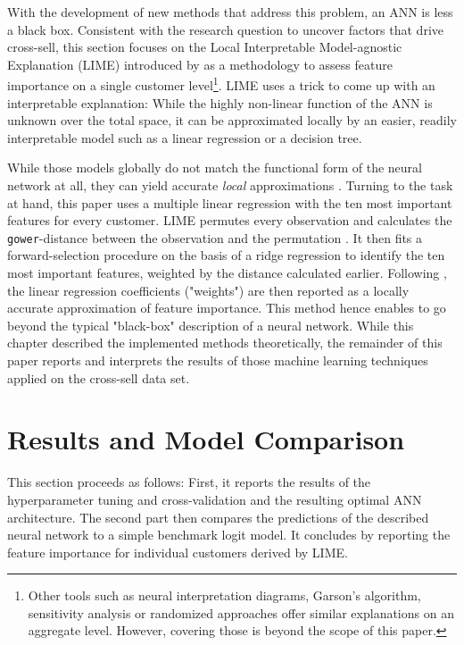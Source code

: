 \documentclass[12pt,a4paper]{article}
\let\code=\texttt
\begin{document}
With the development of new methods that address this problem, an ANN is less a black box.
Consistent with the research question to uncover factors that drive cross-sell, 
this section focuses on the Local Interpretable Model-agnostic Explanation (LIME) introduced by \cite{ribeiroWhyShouldTrust2016a} as a methodology
to assess feature importance on a single customer level\footnote{Other tools such as neural interpretation diagrams, Garson's algorithm, sensitivity analysis or randomized approaches
\citep{oldenIlluminatingBlackBox2002} offer similar explanations on an aggregate level. However, covering those is beyond the scope of this paper.}.
LIME uses a trick to come up with an interpretable explanation: While the highly non-linear function of the ANN is unknown over the total space,
it can be approximated locally by an easier, readily interpretable model such as a linear regression or a decision tree.

While those models globally do not match the functional form of the neural network at all, they can yield accurate \textit{local} approximations
\citep[see figure 3 for a visual example]{ribeiroWhyShouldTrust2016a}.
Turning to the task at hand, this paper uses a multiple linear regression with the ten most important features for every customer.
LIME permutes every observation and calculates the \code{gower}-distance between the observation and the permutation \citep{pedersenUnderstandingLime2018}.
It then fits a forward-selection procedure on the basis of a ridge regression \citep{pedersenPackageLimeLocal2018} to identify the ten most 
important features, weighted by the distance calculated earlier.
Following \cite{ribeiroWhyShouldTrust2016a}, the linear regression coefficients ("weights") are then reported as a locally accurate approximation of feature importance.
This method hence enables to go beyond the typical "black-box" description of a neural network.
While this chapter described the implemented methods theoretically, the remainder of this paper reports and interprets the results of those 
machine learning techniques applied on the cross-sell data set.

\section{Results and Model Comparison}
This section proceeds as follows: First, it reports the results of the hyperparameter tuning and cross-validation and the resulting optimal ANN architecture.
The second part then compares the predictions of the described neural network to a simple benchmark logit model.
It concludes by reporting the feature importance for individual customers derived by LIME.
\end{document}
